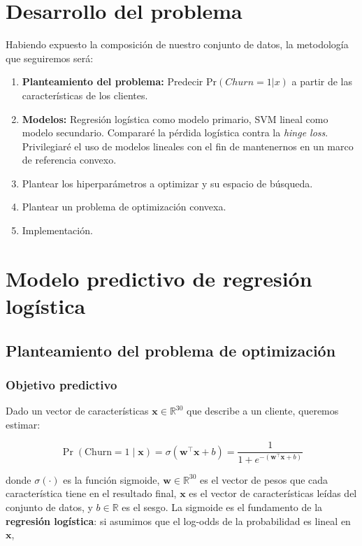 \documentclass[spanish]{article}
\begin{document}
\section{Desarrollo del problema}

Habiendo expuesto la composición de nuestro conjunto de datos, la metodología que seguiremos será:

\begin{enumerate}
   \item \textbf{Planteamiento del problema:} Predecir $\mathrm{Pr}(Churn = 1 | x)$ a partir de las características de los clientes.
   \item \textbf{Modelos:} Regresión logística como modelo primario, SVM lineal como modelo secundario. Compararé la pérdida logística contra la \textit{hinge loss}. Privilegiaré el uso de modelos lineales con el fin de mantenernos en un marco de referencia convexo.
   \item Plantear los hiperparámetros a optimizar y su espacio de búsqueda.
   \item Plantear un problema de optimización convexa.
   \item Implementación.
\end{enumerate}




\section{Modelo predictivo de regresión logística}

\subsection{Planteamiento del problema de optimización}

\subsubsection{Objetivo predictivo}

Dado un vector de características $\mathbf{x} \in \mathbb{R}^{30}$ que describe a un cliente, queremos estimar:

\begin{equation}
\Pr(\text{Churn} = 1 \mid \mathbf{x}) = \sigma(\mathbf{w}^\top \mathbf{x} + b) = \frac{1}{1 + e^{-(\mathbf{w}^\top \mathbf{x} + b)}}
\end{equation}

donde $\sigma(\cdot)$ es la función sigmoide, $\mathbf{w} \in \mathbb{R}^{30}$ es el vector de pesos que cada característica tiene en el resultado final, $\mathbf{x}$ es el vector de características leídas del conjunto de datos, y $b \in \mathbb{R}$ es el sesgo. La sigmoide es el fundamento de la \textbf{regresión logística}: si asumimos que el log-odds de la probabilidad es lineal en $\mathbf{x}$,
\end{document}
